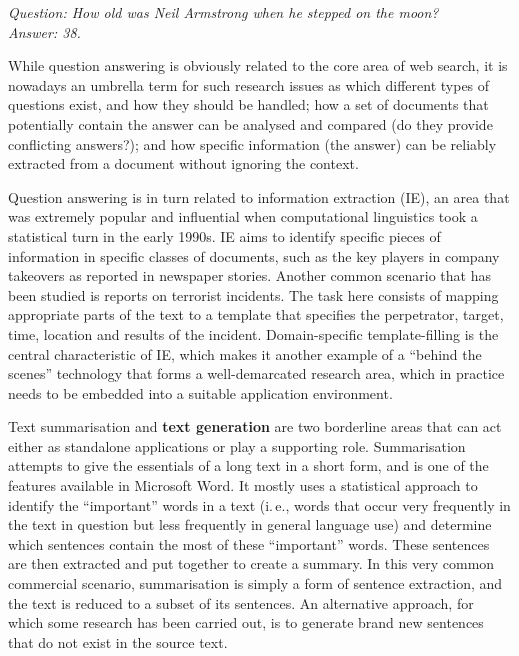 \documentclass[]{../metanetpaper}
\begin{document}
\begin{multicols}{2}
\textit{Question: How old was Neil Armstrong when he stepped on the moon?}\\
\textit{Answer: 38.}

While question answering is obviously related to the core area of web search, it is nowadays an umbrella term for such research issues as which different types of questions exist, and how they should be handled; how a set of documents that potentially contain the answer can be analysed and compared (do they provide conflicting answers?); and how specific information (the answer) can be reliably extracted from a document without ignoring the context. 


Question answering is in turn related to information extraction (IE), an area that was extremely popular and influential when computational linguistics took a statistical turn in the early 1990s. IE aims to identify specific pieces of information in specific classes of documents, such as the key players in company takeovers as reported in newspaper stories. Another common scenario that has been studied is reports on terrorist incidents. The task here consists of mapping appropriate parts of the text to a template that specifies the perpetrator, target, time, location and results of the incident. Domain-specific template-filling is the central characteristic of IE, which makes it another example of a “behind the scenes” technology that forms a well-demarcated research area, which in practice needs to be embedded into a suitable application environment. 

    Text summarisation and \textbf{text generation} are two borderline areas that can act either as standalone applications or play a supporting role. Summarisation attempts to give the essentials of a long text in a short form, and is one of the features available in Microsoft Word. It mostly uses a statistical approach to identify the “important” words in a text (i.\,e., words that occur very frequently in the text in question but less frequently in general language use) and determine which sentences contain the most of these “important” words. These sentences are then extracted and put together to create a summary. In this very common commercial scenario, summarisation is simply a form of sentence extraction, and the text is reduced to a subset of its sentences. An alternative approach, for which some research has been carried out, is to generate brand new sentences that do not exist in the source text. 


\end{multicols}
\end{document}
